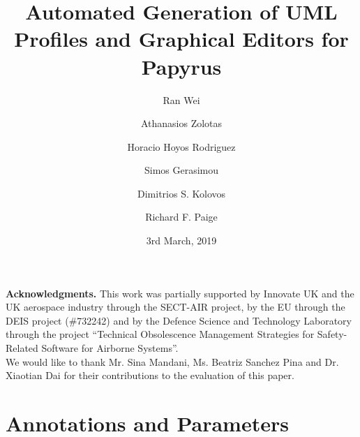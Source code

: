 \documentclass[global]{svjour}
\begin{document}
\title{Automated Generation of UML Profiles and Graphical Editors for Papyrus}

\author{Ran Wei \and Athanasios Zolotas \and Horacio Hoyos Rodriguez \and Simos Gerasimou \and Dimitrios S. Kolovos \and Richard F. Paige}

\date{3rd March, 2019}
\maketitle{}










\noindent\textbf{Acknowledgments.}
This work was partially supported by Innovate UK and the UK aerospace industry through the SECT-AIR project, by the EU through the DEIS project (\#732242) and by the Defence Science and Technology Laboratory through the project ``Technical Obsolescence Management Strategies for Safety-Related Software for Airborne Systems''.\\

We would like to thank Mr. Sina Mandani, Ms. Beatriz Sanchez Pina and Dr. Xiaotian Dai for their contributions to the evaluation of this paper.
\appendix
\section{Annotations and Parameters}

%
\clearpage


\end{document}
